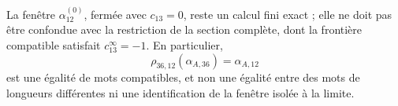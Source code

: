 La fenêtre \(\alpha_{12}^{(0)}\), fermée avec \(c_{13}=0\), reste un
calcul fini exact ; elle ne doit pas être confondue avec la restriction de la section
complète, dont la frontière compatible satisfait \(c_{13}^{\infty}=-1\). En
particulier,
\begin{equation}
 \rho_{36,12}(\alpha_{A,36})=\alpha_{A,12}
 \label{eq:alpha-rho-36-12-proyectiva}
\end{equation}
est une égalité de mots compatibles, et non une égalité entre des mots de
longueurs différentes ni une identification de la fenêtre isolée à la
limite.




